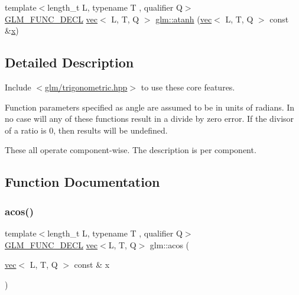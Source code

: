 \begin{DoxyCompactItemize}
\item 
{\footnotesize template$<$length\+\_\+t L, typename T , qualifier Q$>$ }\\\mbox{\hyperlink{setup_8hpp_ab2d052de21a70539923e9bcbf6e83a51}{G\+L\+M\+\_\+\+F\+U\+N\+C\+\_\+\+D\+E\+CL}} \mbox{\hyperlink{structglm_1_1vec}{vec}}$<$ L, T, Q $>$ \mbox{\hyperlink{group__core__func__trigonometric_gabc925650e618357d07da255531658b87}{glm\+::atanh}} (\mbox{\hyperlink{structglm_1_1vec}{vec}}$<$ L, T, Q $>$ const \&\mbox{\hyperlink{_s_d_l__opengl_8h_ad0e63d0edcdbd3d79554076bf309fd47}{x}})
\end{DoxyCompactItemize}


\subsection{Detailed Description}
Include $<$\mbox{\hyperlink{trigonometric_8hpp}{glm/trigonometric.\+hpp}}$>$ to use these core features.

Function parameters specified as angle are assumed to be in units of radians. In no case will any of these functions result in a divide by zero error. If the divisor of a ratio is 0, then results will be undefined.

These all operate component-\/wise. The description is per component. 

\subsection{Function Documentation}
\mbox{\label{group__core__func__trigonometric_gacc9b092df8257c68f19c9053703e2563}} 
\subsubsection{\texorpdfstring{acos()}{acos()}}
{\footnotesize\ttfamily template$<$length\+\_\+t L, typename T , qualifier Q$>$ \\
\mbox{\hyperlink{setup_8hpp_ab2d052de21a70539923e9bcbf6e83a51}{G\+L\+M\+\_\+\+F\+U\+N\+C\+\_\+\+D\+E\+CL}} \mbox{\hyperlink{structglm_1_1vec}{vec}}$<$L, T, Q$>$ glm\+::acos (\begin{DoxyParamCaption}\item[{\mbox{\hyperlink{structglm_1_1vec}{vec}}$<$ L, T, Q $>$ const \&}]{x }\end{DoxyParamCaption})}

